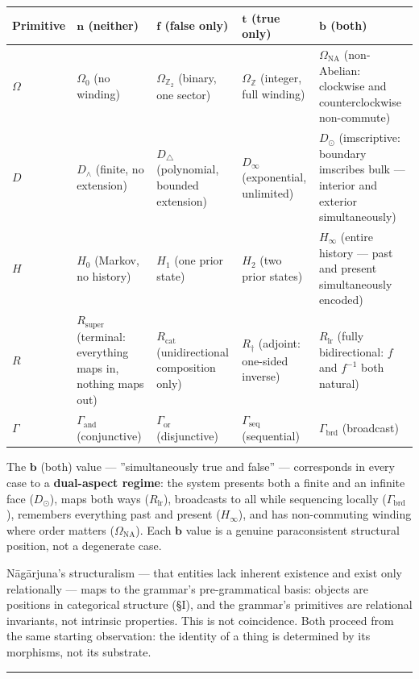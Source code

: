 \documentclass[12pt,a4paper]{article}
\newcommand{\pilcrow}{\S}
\begin{document}
\begin{table}[htbp]
\centering
\small
{}
\begin{tabularx}{\textwidth}{>{\centering\arraybackslash}X >{\centering\arraybackslash}X >{\centering\arraybackslash}X >{\centering\arraybackslash}X >{\centering\arraybackslash}X}
\toprule
\rowcolor{gray!25}\textbf{Primitive} & \textbf{$\mathbf{n}$ (neither)} & \textbf{$\mathbf{f}$ (false only)} & \textbf{$\mathbf{t}$ (true only)} & \textbf{$\mathbf{b}$ (both)} \\
\midrule
\rowcolors{1}{white}{gray!10}
$\Omega$ & $\Omega_0$ (no winding) & $\Omega_{\mathbb{Z}_2}$ (binary, one sector) & $\Omega_\mathbb{Z}$ (integer, full winding) & $\Omega_\text{NA}$ (non-Abelian: clockwise and counterclockwise non-commute) \\
$D$ & $D_{\wedge}$ (finite, no extension) & $D_{\triangle}$ (polynomial, bounded extension) & $D_{\infty}$ (exponential, unlimited) & $D_{\odot}$ (imscriptive: boundary imscribes bulk --- interior and exterior simultaneously) \\
$H$ & $H_0$ (Markov, no history) & $H_1$ (one prior state) & $H_2$ (two prior states) & $H_{\infty}$ (entire history --- past and present simultaneously encoded) \\
$R$ & $R_\text{super}$ (terminal: everything maps in, nothing maps out) & $R_\text{cat}$ (unidirectional composition only) & $R_{\dagger}$ (adjoint: one-sided inverse) & $R_\text{lr}$ (fully bidirectional: $f$ and $f^{-1}$ both natural) \\
$\Gamma$ & $\Gamma_\text{and}$ (conjunctive) & $\Gamma_\text{or}$ (disjunctive) & $\Gamma_\text{seq}$ (sequential) & $\Gamma_\text{brd}$ (broadcast) \\
\bottomrule
\end{tabularx}
\end{table}

The $\mathbf{b}$ (both) value --- ''simultaneously true and false'' --- corresponds in every case to a \textbf{dual-aspect regime}: the system presents both a finite and an infinite face ($D_\odot$), maps both ways ($R_\text{lr}$), broadcasts to all while sequencing locally ($\Gamma_\text{brd}$), remembers everything past and present ($H_\infty$), and has non-commuting winding where order matters ($\Omega_\text{NA}$). Each $\mathbf{b}$ value is a genuine paraconsistent structural position, not a degenerate case.

N\={a}g\={a}rjuna's structuralism --- that entities lack inherent existence and exist only relationally --- maps to the grammar's pre-grammatical basis: objects are positions in categorical structure (\pilcrow{}I), and the grammar's primitives are relational invariants, not intrinsic properties. This is not coincidence. Both proceed from the same starting observation: the identity of a thing is determined by its morphisms, not its substrate.\begin{center}
\rule{0.5\textwidth}{0.4pt}
\end{center}
\end{document}
